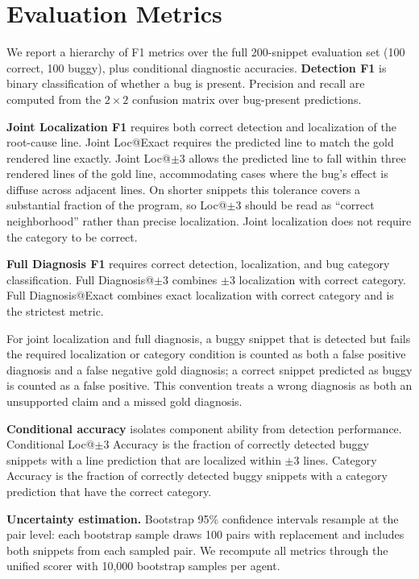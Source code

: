 \documentclass[11pt]{article}
\begin{document}
\section{Evaluation Metrics}

We report a hierarchy of F1 metrics over the full 200-snippet evaluation set (100 correct, 100 buggy), plus conditional diagnostic accuracies. \textbf{Detection F1} is binary classification of whether a bug is present. Precision and recall are computed from the $2\times2$ confusion matrix over bug-present predictions.

\textbf{Joint Localization F1} requires both correct detection and localization of the root-cause line. Joint Loc@Exact requires the predicted line to match the gold rendered line exactly. Joint Loc@$\pm$3 allows the predicted line to fall within three rendered lines of the gold line, accommodating cases where the bug's effect is diffuse across adjacent lines. On shorter snippets this tolerance covers a substantial fraction of the program, so Loc@$\pm$3 should be read as ``correct neighborhood'' rather than precise localization. Joint localization does not require the category to be correct.

\textbf{Full Diagnosis F1} requires correct detection, localization, and bug category classification. Full Diagnosis@$\pm$3 combines $\pm$3 localization with correct category. Full Diagnosis@Exact combines exact localization with correct category and is the strictest metric.

For joint localization and full diagnosis, a buggy snippet that is detected but fails the required localization or category condition is counted as both a false positive diagnosis and a false negative gold diagnosis; a correct snippet predicted as buggy is counted as a false positive. This convention treats a wrong diagnosis as both an unsupported claim and a missed gold diagnosis.

\textbf{Conditional accuracy} isolates component ability from detection performance. Conditional Loc@$\pm$3 Accuracy is the fraction of correctly detected buggy snippets with a line prediction that are localized within $\pm$3 lines. Category Accuracy is the fraction of correctly detected buggy snippets with a category prediction that have the correct category.

\textbf{Uncertainty estimation.} Bootstrap 95\% confidence intervals resample at the pair level: each bootstrap sample draws 100 pairs with replacement and includes both snippets from each sampled pair. We recompute all metrics through the unified scorer with 10,000 bootstrap samples per agent.
\end{document}
